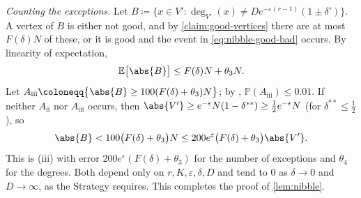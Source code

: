 \emph{Counting the exceptions.} Let \(B \coloneqq \{ x \in V' : \deg_{V'}(x) \ne D e^{-\varepsilon(r-1)}(1 \pm \delta') \}\). A vertex of \(B\) is either not good, and by \autoref{claim:good-vertices} there are at most \(F(\delta) N\) of these, or it is good and the event in \eqref{eq:nibble-good-bad} occurs. By linearity of expectation,
\[
    \mathbb{E}\bigl[ \abs{B} \bigr] \le F(\delta) N + \theta_{3} N .
\]
Let \(A_{\mathrm{iii}} \coloneqq \bigl\{ \abs{B} \ge 100 (F(\delta) + \theta_{3}) N \bigr\}\); by , \(\mathbb{P}(A_{\mathrm{iii}}) \le 0.01\). If neither \(A_{\mathrm{ii}}\) nor \(A_{\mathrm{iii}}\) occurs, then \(\abs{V'} \ge e^{-\varepsilon} N (1 - \delta^{**}) \ge \frac{1}{2} e^{-\varepsilon} N\) (for \(\delta^{**} \le \frac{1}{2}\)), so
\[
    \abs{B} < 100 \bigl( F(\delta) + \theta_{3} \bigr) N \le 200 e^{\varepsilon} \bigl( F(\delta) + \theta_{3} \bigr) \abs{V'} .
\]
This is (iii) with error \(200 e^{\varepsilon}(F(\delta) + \theta_{3})\) for the number of exceptions and \(\theta_{4}\) for the degrees. Both depend only on \(r, K, \varepsilon, \delta, D\) and tend to \(0\) as \(\delta \to 0\) and \(D \to \infty\), as the Strategy requires. This completes the proof of \autoref{lem:nibble}.
